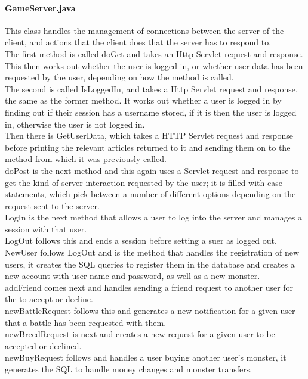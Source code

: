 \documentclass{project}
\begin{document}
\paragraph{GameServer.java}
This class handles the management of connections between the server of the client, and actions that the client does that the server has to respond to.\\
The first method is called doGet and takes an Http Servlet request and response. This then works out whether the user is logged in, or whether user data has been requested by the user, depending on how the method is called.\\
The second is called IsLoggedIn, and takes a Http Servlet request and response, the same as the former method. It works out whether a user is logged in by finding out if their session has a username stored, if it is then the user is logged in, otherwise the user is not logged in.\\
Then there is GetUserData, which takes a HTTP Servlet request and response before printing the relevant articles returned to it and sending them on to the method from which it was previously called.\\
doPost is the next method and this again uses a Servlet request and response to get the kind of server interaction requested by the user; it is filled with case statements, which pick between a number of different options depending on the request sent to the server.\\
LogIn is the next method that allows a user to log into the server and manages a session with that user.\\
LogOut follows this and ends a session before setting a suer as logged out.\\
NewUser follows LogOut and is the method that handles the registration of new users, it creates the SQL queries to register them in the database and creates a new account with user name and password, as well as a new monster.\\
addFriend comes next and handles sending a friend request to another user for the to accept or decline.\\
newBattleRequest follows this and generates a new notification for a given user that a battle has been requested with them.\\
newBreedRequest is next and creates a new request for a given user to be accepted or declined.\\
newBuyRequest follows and handles a user buying another user's monster, it generates the SQL to handle money changes and monster transfers.\\
\end{document}
